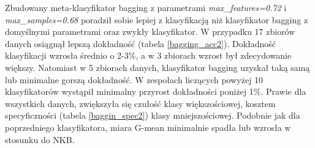 Zbudowany meta-klasyfikator bagging z parametrami \textit{max\_features=0.72} i \textit{max\_samples=0.68} poradził sobie lepiej z klasyfikacją niż klasyfikator bagging z domyślnymi parametrami oraz zwykły klasyfikator. W przypadku 17 zbiorów danych osiągnął lepszą dokładność (tabela \ref{bagging_acc2}). Dokładność klasyfikacji wzrosła średnio o 2-3\%, a w 3 zbiorach wzrost był zdecydowanie większy. Natomiast w 5 zbiorach danych, klasyfikator bagging uzyskał taką samą lub minimalne gorszą dokładność. W zespołach liczących powyżej 10 klasyfikatorów wystąpił minimalny przyrost dokładności poniżej 1\%. Prawie dla wszystkich danych, zwiększyła się czułość klasy większościowej, kosztem specyficzności (tabela \ref{baggin_spec2}) klasy mniejszościowej. Podobnie jak dla poprzedniego klasyfikatora, miara G-mean minimalnie spadła lub wzrosła w stosunku do NKB.
\begin{table}[H]
	\tiny
	\begin{center}
\end{center}
\end{table}
